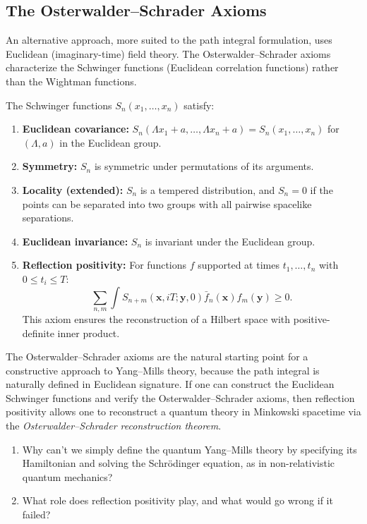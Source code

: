 \subsection{The Osterwalder--Schrader Axioms}

An alternative approach, more suited to the path integral formulation, uses Euclidean (imaginary-time) field theory. The Osterwalder--Schrader axioms characterize the Schwinger functions (Euclidean correlation functions) rather than the Wightman functions.

\begin{definition}
The Schwinger functions $S_n(x_1, \ldots, x_n)$ satisfy:
\begin{enumerate}
  \item \textbf{Euclidean covariance:} $S_n(\Lambda x_1 + a, \ldots, \Lambda x_n + a) = S_n(x_1, \ldots, x_n)$ for $(\Lambda, a)$ in the Euclidean group.

  \item \textbf{Symmetry:} $S_n$ is symmetric under permutations of its arguments.

  \item \textbf{Locality (extended):} $S_n$ is a tempered distribution, and $S_n = 0$ if the points can be separated into two groups with all pairwise spacelike separations.

  \item \textbf{Euclidean invariance:} $S_n$ is invariant under the Euclidean group.

  \item \textbf{Reflection positivity:} For functions $f$ supported at times $t_1, \ldots, t_n$ with $0 \le t_i \le T$:
  \[
  \sum_{n,m} \int S_{n+m}(\mathbf{x}, iT; \mathbf{y}, 0) \bar{f}_n(\mathbf{x}) f_m(\mathbf{y}) \ge 0.
  \]
  This axiom ensures the reconstruction of a Hilbert space with positive-definite inner product.
\end{enumerate}
\end{definition}

The Osterwalder--Schrader axioms are the natural starting point for a constructive approach to Yang--Mills theory, because the path integral is naturally defined in Euclidean signature. If one can construct the Euclidean Schwinger functions and verify the Osterwalder--Schrader axioms, then reflection positivity allows one to reconstruct a quantum theory in Minkowski spacetime via the \textit{Osterwalder--Schrader reconstruction theorem}.

\begin{checkyou}
\begin{enumerate}
\item Why can't we simply define the quantum Yang--Mills theory by specifying its Hamiltonian and solving the Schr\"{o}dinger equation, as in non-relativistic quantum mechanics?
\item What role does reflection positivity play, and what would go wrong if it failed?
\end{enumerate}
\end{checkyou}

